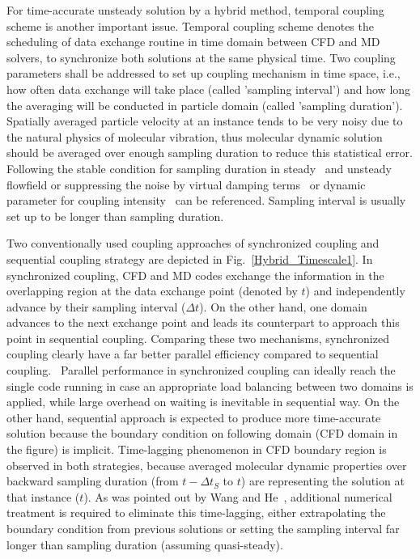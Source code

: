 \documentclass[conference,final]{IEEEtran}
\begin{document}


For time-accurate unsteady solution by a hybrid method, temporal coupling scheme is another important issue. Temporal coupling scheme denotes the scheduling of data exchange routine in time domain between CFD and MD solvers, to synchronize both solutions at the same physical time. Two coupling parameters shall be addressed to set up coupling mechanism in time space, i.e., how often data exchange will take place (called 'sampling interval') and how long the averaging will be conducted in particle domain (called 'sampling duration'). Spatially averaged particle velocity at an instance tends to be very noisy due to the natural physics of molecular vibration, thus molecular dynamic solution should be averaged over enough sampling duration to reduce this statistical error. Following the stable condition for sampling duration in steady~\cite{Hadjicon2} and unsteady~\cite{Time_Mechanism} flowfield or suppressing the noise by virtual damping terms~\cite{Cui} or dynamic parameter for coupling intensity~\cite{Wang} can be referenced. Sampling interval is usually set up to be longer than sampling duration.


Two conventionally used coupling approaches of synchronized coupling and sequential coupling strategy are depicted in Fig.~\ref{Hybrid_Timescale1}. In synchronized coupling, CFD and MD codes exchange the information in the overlapping region at the data exchange point (denoted by $t$) and independently advance by their sampling interval (${\Delta}t$). On the other hand, one domain advances to the next exchange point and leads its counterpart to approach this point in sequential coupling. Comparing these two mechanisms, synchronized coupling clearly have a far better parallel efficiency compared to sequential coupling.~\cite{Time_Mechanism} Parallel performance in synchronized coupling can ideally reach the single code running in case an appropriate load balancing between two domains is applied, while large overhead on waiting is inevitable in sequential way. On the other hand, sequential approach is expected to produce more time-accurate solution because the boundary condition on following domain (CFD domain in the figure) is implicit. Time-lagging phenomenon in CFD boundary region is observed in both strategies, because averaged molecular dynamic properties over backward sampling duration (from $t-{\Delta}t_S$ to $t$) are representing the solution at that instance ($t$). As was pointed out by Wang and He~\cite{Wang}, additional numerical treatment is required to eliminate this time-lagging, either extrapolating the boundary condition from previous solutions or setting the sampling interval far longer than sampling duration (assuming quasi-steady).
\end{document}

